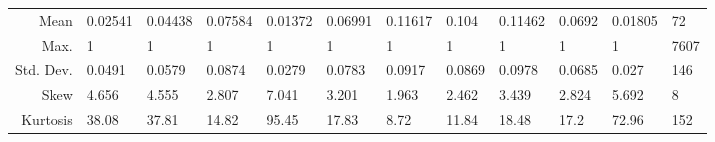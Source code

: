 \documentclass[11pt, a4paper]{article}
\begin{document}
\begin{table}[ht]
{\begin{tabular}{|r|lllllllllll|}
  Mean & 0.02541 & 0.04438 & 0.07584 & 0.01372 & 0.06991 & 0.11617 & 0.104 & 0.11462 & 0.0692 & 0.01805 & 72 \\ 
  Max. & 1 & 1 & 1 & 1 & 1 & 1 & 1 & 1 & 1 & 1 & 7607 \\ 
  Std. Dev. & 0.0491 & 0.0579 & 0.0874 & 0.0279 & 0.0783 & 0.0917 & 0.0869 & 0.0978 & 0.0685 & 0.027 & 146 \\ 
  Skew & 4.656 & 4.555 & 2.807 & 7.041 & 3.201 & 1.963 & 2.462 & 3.439 & 2.824 & 5.692 & 8 \\ 
  Kurtosis & 38.08 & 37.81 & 14.82 & 95.45 & 17.83 & 8.72 & 11.84 & 18.48 & 17.2 & 72.96 & 152 \\ 
   \hline
\end{tabular}}
\end{table}
\end{document}
